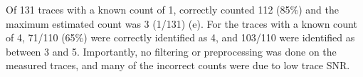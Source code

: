 Of 131 traces with a known count of 1, \ours correctly counted 112 (85\%) and the maximum estimated count was 3 (1/131) (e).
	For the traces with a known count of 4, 71/110 (65\%) were correctly identified as 4, and 103/110 were identified as between 3 and 5.
	Importantly, no filtering or preprocessing was done on the measured traces, and many of the incorrect counts were due to low trace SNR. %

